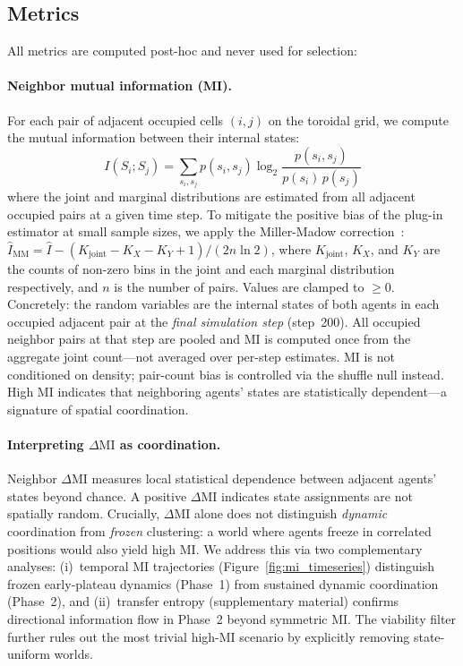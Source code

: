 \documentclass[letterpaper]{article}
\begin{document}
\subsection{Metrics}

All metrics are computed post-hoc and never used for selection:

\paragraph{Neighbor mutual information (MI).}
For each pair of adjacent occupied cells $(i, j)$ on the toroidal grid, we
compute the mutual information between their internal states:
\begin{equation}
  I(S_i; S_j) = \sum_{s_i, s_j} p(s_i, s_j)
    \log_2 \frac{p(s_i, s_j)}{p(s_i)\,p(s_j)}
\end{equation}
where the joint and marginal distributions are estimated from all adjacent
occupied pairs at a given time step. To mitigate the positive bias of the
plug-in estimator at small sample sizes, we apply the Miller-Madow
correction~\citep{miller1955note}: $\hat{I}_{\mathrm{MM}} = \hat{I} -
(K_{\mathrm{joint}} - K_X - K_Y + 1)/(2n\ln 2)$, where $K_{\mathrm{joint}}$,
$K_X$, and $K_Y$ are the counts of non-zero bins in the joint and each marginal
distribution respectively, and $n$ is the number of pairs. Values are clamped
to $\geq 0$.
Concretely: the random variables are the internal states of both agents in each
occupied adjacent pair at the \emph{final simulation step} (step~200).
All occupied neighbor pairs at that step are pooled and MI is computed once
from the aggregate joint count---not averaged over per-step estimates.
MI is not conditioned on density; pair-count bias is controlled via the
shuffle null instead.
High MI indicates that neighboring agents' states are statistically
dependent---a signature of spatial coordination.

\paragraph{Interpreting $\Delta\mathrm{MI}$ as coordination.}
Neighbor $\Delta\mathrm{MI}$ measures local statistical dependence between
adjacent agents' states beyond chance.  A positive $\Delta\mathrm{MI}$
indicates state assignments are not spatially random.  Crucially,
$\Delta\mathrm{MI}$ alone does not distinguish \emph{dynamic} coordination
from \emph{frozen} clustering: a world where agents freeze in correlated
positions would also yield high MI.  We address this via two complementary
analyses: (i)~temporal MI trajectories (Figure~\ref{fig:mi_timeseries})
distinguish frozen early-plateau dynamics (Phase~1) from sustained dynamic
coordination (Phase~2), and (ii)~transfer entropy (supplementary material)
confirms directional information flow in Phase~2 beyond symmetric MI.
The viability filter further rules out the most trivial high-MI scenario by
explicitly removing state-uniform worlds.
\end{document}
